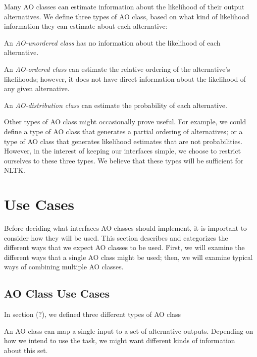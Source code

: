 \documentclass[11pt]{article}
\begin{document}
  Many AO classes can estimate information about the likelihood of
  their output alternatives.  We define three types of AO class, based
  on what kind of likelihood information they can estimate about each
  alternative:

  \begin{description}
    \item An \emph{AO-unordered class} has no information about the
    likelihood of each alternative.

    \item An \emph{AO-ordered class} can estimate the relative
    ordering of the alternative's likelihoods; however, it does not
    have direct information about the likelihood of any given
    alternative.

    \item An \emph{AO-distribution class} can estimate the probability
    of each alternative.
  \end{description}

  Other types of AO class might occasionally prove useful.  For
  example, we could define a type of AO class that generates a partial
  ordering of alternatives; or a type of AO class that generates
  likelihood estimates that are not probabilities.  However, in the
  interest of keeping our interfaces simple, we choose to restrict
  ourselves to these three types.  We believe that these types will be
  sufficient for NLTK.

\section{Use Cases}

  Before deciding what interfaces AO classes should implement, it is
  important to consider how they will be used.  This section describes
  and categorizes the different ways that we expect AO classes to be
  used.  First, we will examine the different ways that a single AO
  class might be used; then, we will examine typical ways of combining
  multiple AO classes.

  \subsection{AO Class Use Cases}

    

In section (?), we defined three different types of AO class

    An AO class can map a single input to a set of alternative
    outputs.  Depending on how we intend to use the task, we might
    want different kinds of information about this set.
\end{document}
